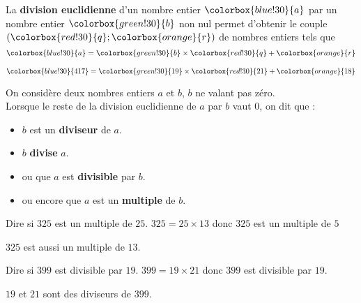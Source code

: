 \begin{propriete}[\admise]
La \textbf{division euclidienne} d'un nombre entier $\colorbox{blue!30}{a}$ par un nombre entier $\colorbox{green!30}{b}$ non nul 
permet d'obtenir le couple $(\colorbox{red!30}{q};\colorbox{orange}{r})$ de nombres entiers tels que
$$\colorbox{blue!30}{a}=\colorbox{green!30}{b}\times \colorbox{red!30}{q}+ \colorbox{orange}{r}$$
\end{propriete}

\begin{exemple*1}
$\colorbox{blue!30}{417}=\colorbox{green!30}{19}\times \colorbox{red!30}{21}+ \colorbox{orange}{18}$
\end{exemple*1}

\begin{definition}
On considère deux nombres entiers $a$ et $b$, $b$ ne valant pas zéro.\\
Lorsque le reste de la division euclidienne de $a$ par $b$ vaut $0$, on dit que :
	\begin{itemize}
		\item $b$ est un \textbf{diviseur} de $a$.
		\item $b$ \textbf{divise} $a$.
		\item ou que $a$ est \textbf{divisible} par $b$.
		\item ou encore que $a$ est un \textbf{multiple} de $b$.
	\end{itemize}
\end{definition}

\begin{exemple}
Dire si $325$ est un multiple de $25$.
\correction 
$325=25\times13$ donc $325$ est un multiple de $5$
\end{exemple}
\begin{remarque}
	$325$ est aussi un multiple de $13$.
\end{remarque}

\begin{exemple}
	Dire si $399$ est divisible par $19$.
	\correction 
	$399=19\times21$ donc $399$ est divisible par $19$.
\end{exemple}
\begin{remarque}
	$19$ et $21$ sont des diviseurs de $399$.
\end{remarque}


